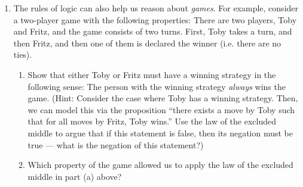 \documentclass[11pt]{article}
\begin{document}
\begin{enumerate}
    \item The rules of logic can also help us reason about \emph{games}. For example, consider a two-player game with the following properties: There are two players, Toby and Fritz, and the game consists of two turns. First, Toby takes a turn, and then Fritz, and then one of them is declared the winner (i.e. there are no ties).
        \begin{enumerate}
            \item Show that either Toby or Fritz must have a winning strategy in the following sense: The person with the winning strategy \emph{always} wins the game. (Hint: Consider the case where Toby has a winning strategy. Then, we can model this via the proposition ``there exists a move by Toby such that for all moves by Fritz, Toby wins.'' Use the law of the excluded middle to argue that if this statement is false, then its negation must be true --- what is the negation of this statement?)
            \item Which property of the game allowed us to apply the law of the excluded middle in part (a) above?
        \end{enumerate}
\end{enumerate}
\end{document}
